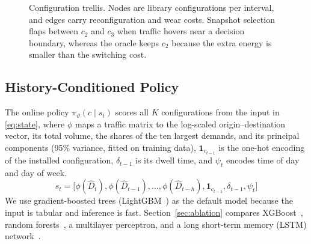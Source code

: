 \documentclass[journal]{IEEEtran}
\begin{document}
\begin{figure}[t]
\centering
{}
\caption{Configuration trellis. Nodes are library configurations per interval, and edges carry reconfiguration and wear costs. Snapshot selection flaps between $c_2$ and $c_3$ when traffic hovers near a decision boundary, whereas the oracle keeps $c_2$ because the extra energy is smaller than the switching cost.}
\label{fig:trellis}
\end{figure}

\subsection{History-Conditioned Policy}

The online policy $\pi_\vartheta(c\mid s_t)$ scores all $K$ configurations from the input in \eqref{eq:state}, where $\phi$ maps a traffic matrix to the log-scaled origin--destination vector, its total volume, the shares of the ten largest demands, and its principal components (95\% variance, fitted on training data), $\mathbf{1}_{c_{t-1}}$ is the one-hot encoding of the installed configuration, $\delta_{t-1}$ is its dwell time, and $\psi_t$ encodes time of day and day of week.
\begin{equation}\label{eq:state}
s_t=\big[\phi(\hat{D}_t),\phi(\hat{D}_{t-1}),\dots,\phi(\hat{D}_{t-h}),\mathbf{1}_{c_{t-1}},\delta_{t-1},\psi_t\big]
\end{equation}
We use gradient-boosted trees (LightGBM~\cite{ke2017lightgbm}) as the default model because the input is tabular and inference is fast. Section~\ref{sec:ablation} compares XGBoost~\cite{chen2016xgboost}, random forests~\cite{breiman2001rf}, a multilayer perceptron, and a long short-term memory (LSTM) network~\cite{hochreiter1997lstm}.
\end{document}
